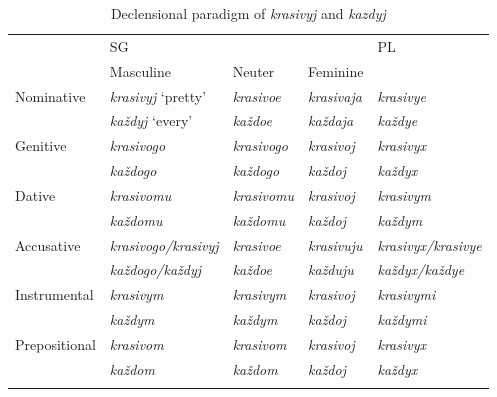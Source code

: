 \documentclass[output=paper,
colorlinks,
citecolor=brown,
newtxmath
]{langscibook}
\begin{document}
\begin{sidewaystable}\caption{Declensional paradigm of \textit{krasivyj} and \textit{kazdyj}}\label{tab:2_kazdyj}
\begin{tabularx}{\textwidth}{X|XXX|X}
\lsptoprule
&                   SG                  &               &                                       & PL\\
&                   Masculine                   & Neuter                & Feminine              &\\
\midrule
Nominative&     \textit{krasivyj} `pretty'   & \textit{krasivoe}     & \textit{krasivaja}     & \textit{krasivye}\\ 
&               \textit{každyj} `every'      & \textit{každoe}       & \textit{každaja}       & \textit{každye}\\ 
\midrule
Genitive&       \textit{krasivogo}           & \textit{krasivogo}     & \textit{krasivoj}      & \textit{krasivyx}\\
&               \textit{každogo}             & \textit{každogo}       & \textit{každoj}        & \textit{každyx}\\ 
\midrule
Dative&         \textit{krasivomu}           & \textit{krasivomu}     & \textit{krasivoj}      & \textit{krasivym}\\ 
&               \textit{každomu}             & \textit{každomu}       & \textit{každoj}        & \textit{každym}\\
\midrule
Accusative&     \textit{krasivogo/krasivyj}  & \textit{krasivoe}      & \textit{krasivuju}     & \textit{krasivyx/krasivye}\\
&               \textit{každogo/každyj}      & \textit{každoe}        & \textit{každuju}       & \textit{každyx/každye}\\
\midrule
Instrumental&   \textit{krasivym}            & \textit{krasivym}      & \textit{krasivoj}      & \textit{krasivymi}\\
&               \textit{každym}              & \textit{každym}        & \textit{každoj}        & \textit{každymi}\\
\midrule
Prepositional&  \textit{krasivom}            & \textit{krasivom}      & \textit{krasivoj}      & \textit{krasivyx}\\
&               \textit{každom}              & \textit{každom}        & \textit{každoj}        & \textit{každyx}\\
\lspbottomrule
\end{tabularx}
\end{sidewaystable}
\end{document}

